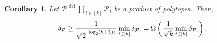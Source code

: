 \documentclass[twoside]{article}
\newcommand\linkofproof[1]{\textbf{of \cref{#1}. }\newtarget{proof:#1}}
\newcommand{\bigomegal}[1]{\Omega\left( #1 \right)}
\newcommand{\jmlrBlackBox}{\rule{1.5ex}{1.5ex}}
\newcommand{\jmlrQED}{\hfill\jmlrBlackBox\par\bigskip}
\providecommand{\proofname}{Proof}
\renewenvironment{proof}{\par\noindent{\bfseries\upshape \proofname\ }}{\jmlrQED}
\newcommand{\mP}{\mathcal{P}}
\newcommand{\mQ}{\mathcal{Q}}
\newcommand{\verts}[1]{\mathcal{V}_{#1}}
\newcommand{\conv}[1]{\mathsf{conv}\left(#1\right)}
\newcommand{\faces}[1]{{\mathsf{faces}^\ast}\left(#1\right)}
\newcommand{\dist}[1]{\mathsf{dist}\left(#1\right)}
\DeclarePairedDelimiter\ceil{\lceil}{\rceil}
\newcommand{\defi}{\stackrel{\mathrm{\scriptscriptstyle def}}{=}}
\newtheorem{corollary}[theorem]{Corollary}
\begin{document}
%
%
%
%
%
%
\begin{corollary}\label{cor:pyr_width_lb_for_k_polytopes}
Let $\mathcal{P} \defi \prod_{i\in[k]} \mathcal{P}_i$ be a product of polytopes. Then, 
\[
\delta_\mathcal{P} \geq \frac{1}{\sqrt{2}^{\ceil{\log_2 (k+1)}}} \min_{i \in [k]} \pw{\mP_i} =\bigomegal{\frac{1}{\sqrt{k}}\min_{i\in[k]} \delta_{\mathcal{P}_i}}.
\] 
\end{corollary}
\end{document}
